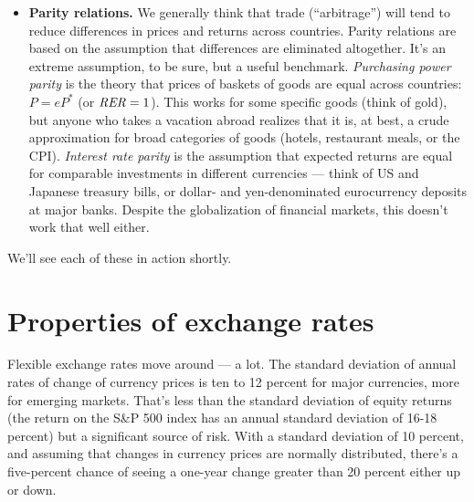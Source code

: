 \begin{itemize}
\item \textbf{Parity relations.}
We generally think that trade (``arbitrage'')
will tend to reduce differences in prices and returns across countries.
Parity relations are based on the assumption that differences are
eliminated altogether.  It's an extreme assumption, to be sure,
but a useful benchmark.
{\it Purchasing power parity  \/} is the theory that prices of baskets of goods are equal across countries:  $P = e P^* $
(or $\mbox{\it RER\/} = 1$).
This works for some specific goods (think of gold),
but anyone who takes a vacation abroad realizes that it is,
at best, a crude approximation for
broad categories of goods (hotels, restaurant meals, or the CPI).
{\it Interest rate parity  \/} is the assumption that expected returns are equal
for comparable investments in different currencies --- think of US and Japanese treasury bills, or dollar- and yen-denominated eurocurrency deposits at major banks.
Despite the globalization of financial markets,
this doesn't work that well either.

\end{itemize}
%
We'll see each of these in action shortly.


\section{Properties of exchange rates}

Flexible exchange rates move around --- a lot.
The standard deviation of annual rates of change of currency prices
is ten to 12 percent for major currencies, more for emerging markets.
That's less than the standard deviation of equity returns
(the return on the S\&P 500 index has an annual standard deviation of 16-18 percent)
but a significant source of risk.
With a standard deviation of 10 percent, and assuming that changes in currency prices are normally distributed,
there's a five-percent chance of seeing a one-year change greater than 20 percent
either up or down.


